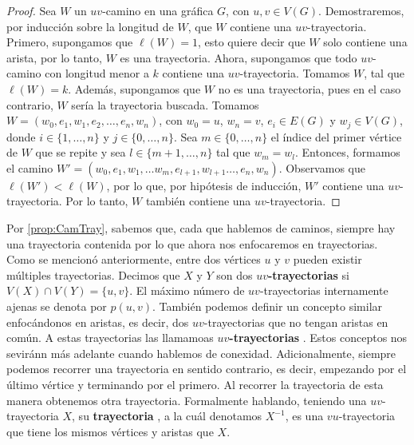 \begin{proof}
    Sea $W$ un $uv$-camino en una gr\'afica $G$, con $u,v \in V(G)$.
    Demostraremos, por inducci\'on sobre la longitud de $W$, que $W$
    contiene una $uv$-trayectoria. Primero, supongamos que $\ell(W)=1$, esto
    quiere decir que $W$ solo contiene una arista, por lo tanto, $W$ es una
    trayectoria. Ahora, supongamos que todo $uv$-camino con longitud menor a
    $k$ contiene una $uv$-trayectoria. Tomamos $W$, tal que $\ell(W) = k$.
    Adem\'as, supongamos que $W$ no es una trayectoria, pues en el caso
    contrario, $W$ ser\'ia la trayectoria buscada. Tomamos $W=
    (w_0,e_1,w_1,e_2, \dots, e_n,w_n)$, con $w_0=u$, $w_n=v$, $e_i \in E(G)$
    y $w_j \in V(G)$, donde $i \in \{1, \dots, n\}$ y $j \in \{0, \dots,
    n\}$. Sea $m \in \{0, \dots, n\}$ el \'indice del primer v\'ertice de
    $W$ que se repite y sea $l \in \{m+1, \dots, n\}$ tal que $w_m = w_l$.
    Entonces, formamos el camino $W'= (w_0,e_1,w_1,\dots w_m, e_{l+1},
    w_{l+1} \dots, e_n,w_n)$. Observamos que $\ell(W')<\ell(W)$, por lo que,
    por hip\'otesis de inducci\'on, $W'$ contiene una $uv$-trayectoria. Por
    lo tanto, $W$ tambi\'en contiene una $uv$-trayectoria.
\end{proof}

Por \cref{prop:CamTray}, sabemos que, cada que hablemos de caminos, siempre hay
una trayectoria contenida por lo que ahora nos enfocaremos en trayectorias. Como
se mencion\'o anteriormente, entre dos v\'ertices $u$ y $v$ pueden existir
m\'ultiples trayectorias. Decimos que $X$ y $Y$ son dos
\textbf{$uv$-trayectorias}  si
$V(X)\cap V(Y)=\{u,v\}$. El m\'aximo n\'umero de $uv$-trayectorias internamente
ajenas se denota por $p(u,v)$. Tambi\'en podemos definir un concepto similar
enfoc\'andonos en aristas, es decir, dos $uv$-trayectorias que no tengan aristas
en com\'un. A estas trayectorias las llamamoas \textbf{$uv$-trayectorias}
. Estos conceptos nos sevir\'ann
m\'as adelante cuando hablemos de conexidad. Adicionalmente, siempre podemos
recorrer una trayectoria en sentido contrario, es decir, empezando por el
\'ultimo v\'ertice y terminando por el primero. Al recorrer la trayectoria de
esta manera obtenemos otra trayectoria. Formalmente hablando, teniendo una
$uv$-trayectoria $X$, su \textbf{trayectoria} ,
a la cu\'al denotamos $X^{-1}$, es una $vu$-trayectoria que tiene los mismos
v\'ertices y aristas que $X$.

